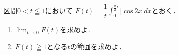 \documentclass[../../main.tex]{subfiles}
\begin{document}
区間$0<t\leqq1$において
$\displaystyle F(t)=\dfrac{1}{t}\int_0^{\frac{\pi}{2}t}|\cos2x|dx$とおく．
\begin{enumerate}
  \item $\displaystyle\lim_{t\to0}F(t)$を求めよ．
  \item $F(t)\geqq1$となる$t$の範囲を求めよ．
\end{enumerate}
\end{document}
